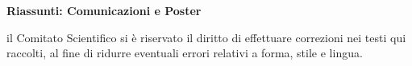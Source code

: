 \documentclass{gircabstract}
\begin{document}
\pagestyle{empty}





\pagestyle{myheadings}        %




\vskip60mm
\begin{center}
\parbox{.9\textwidth}{
\centering\noindent\sffamily\bfseries\Huge{Riassunti: Comunicazioni e Poster}}
\vfill
\parbox{.8\textwidth}{
\centering\small{il Comitato Scientifico si è riservato il diritto di effettuare correzioni nei testi qui raccolti, al fine di ridurre eventuali errori relativi a forma, stile e lingua.}}
\end{center}
\cleardoublepage
\end{document}
